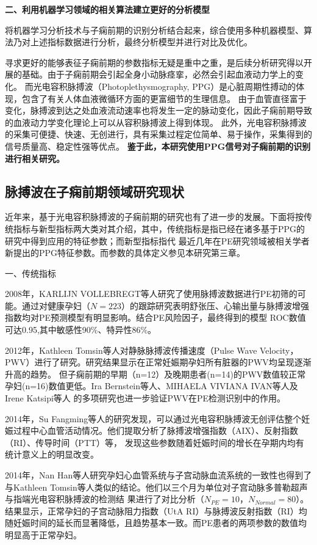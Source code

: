 \textbf{二、利用机器学习领域的相关算法建立更好的分析模型}

将机器学习分析技术与子痫前期的识别分析结合起来，综合使用多种机器模型、算法乃对上述指标数据进行分析，最终分析模型并进行对比及优化。

寻求更好的能够表征子痫前期的参数指标无疑是重中之重，是后续分析研究得以开展的基础。由于子痫前期会引起全身小动脉痉挛，必然会引起血液动力学上的变化。
而光电容积脉搏波（Photoplethysmography, PPG）是心脏周期性搏动的体现，包含了有关人体血液微循环方面的更富细节的生理信息\cite{PPGYY}。
由于血管直径富于变化，脉搏波到达之处血液流动速率也将发生一定的脉动变化，因此子痫前期导致的血液动力学变化理论上可以从容积脉搏波上得到体现。
此外，光电容积脉搏波的采集可便捷、快速、无创进行，具有采集过程定位简单、易于操作，采集得到的信号质量高、稳定性强等优点。
\textbf{鉴于此，本研究使用PPG信号对子痫前期的识别进行相关研究。}

\subsection{脉搏波在子痫前期领域研究现状}
近年来，基于光电容积脉搏波的子痫前期的研究也有了进一步的发展。下面将按传统指标与新型指标两大类对其介绍，其中，传统指标是指已经在诸多基于PPG的研究中得到应用的特征参数；而新型指标指代
最近几年在PE研究领域被相关学者新提出的PPG特征参数。而参数的具体定义参见本研究第三章。

一、传统指标

2008年，KARLIJN VOLLEBREGT等人\cite{KARLIJN2008}研究了使用脉搏波数据进行PE初筛的可能。通过对健康孕妇（$N=223$）的跟踪研究表明舒张压、心输出量与脉搏波增强指数均对PE预测模型有明显影响。结合PE风险因子，最终得到的模型
ROC数值可达0.95,其中敏感性90\%、特异性86\%。

2012年，Kathleen Tomsin等人\cite{Tomsin2012}对静脉脉搏波传播速度（Pulse Wave Velocity，PWV）进行了研究。研究结果显示在正常妊娠期孕妇所有脏器的PWV均呈现逐渐升高的趋势。
但子痫前期的早期（n=12）及晚期患者(n=14)的PWV数值较正常孕妇(n=16)数值更低。Ira Bernstein等人\cite{Ira2014}、MIHAELA VIVIANA IVAN等人\cite{VivianaIvan2018}及Irene Katsipi等人\cite{Katsipi2014}
的多项研究也进一步验证PWV在PE检测识别中的作用。

2014年，Su Fangming等人\cite{Su2014}的研究发现，可以通过光电容积脉搏波无创评估整个妊娠过程中心血管活动情况。他们提取分析了脉搏波增强指数（AIX）、反射指数（RI）、传导时间（PTT）等，
发现这些参数随着妊娠时间的增长在孕期内均有统计意义上的明显改变。

2014年，Nan Han等人\cite{Han2014}研究孕妇心血管系统与子宫动脉血流系统的一致性也得到了与Kathleen Tomsin等人\cite{Tomsin2012}类似的结论。他们以三个月为单位对子宫动脉多普勒超声与指端光电容积脉搏波的检测结
果进行了对比分析（$N_{PE}=10$，$N_{Normal}=80$）。结果显示，正常孕妇的子宫动脉阻力指数（UtA RI）与脉搏波反射指数（RI）均随妊娠时间的延长而显著降低，且趋势基本一致。而PE患者的两项参数的数值均明显高于正常孕妇。

